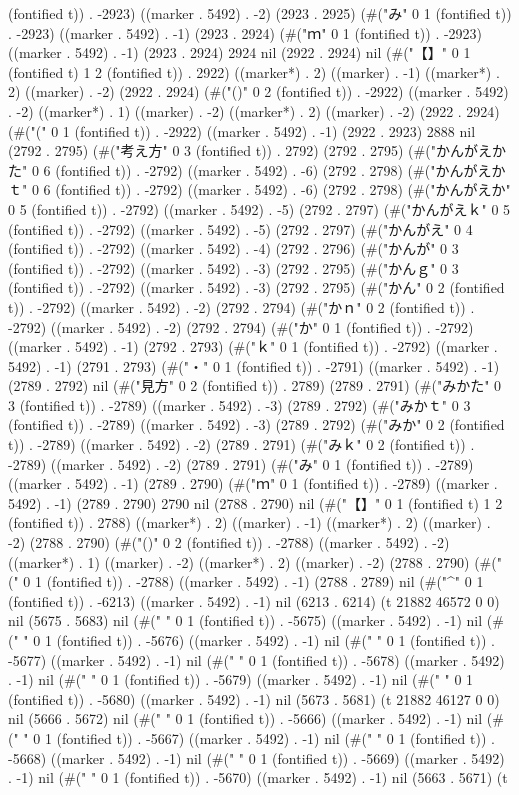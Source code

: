 (fontified t)) . -2923) ((marker . 5492) . -2) (2923 . 2925) (#("み" 0 1 (fontified t)) . -2923) ((marker . 5492) . -1) (2923 . 2924) (#("ｍ" 0 1 (fontified t)) . -2923) ((marker . 5492) . -1) (2923 . 2924) 2924 nil (2922 . 2924) nil (#("【】" 0 1 (fontified t) 1 2 (fontified t)) . 2922) ((marker*) . 2) ((marker) . -1) ((marker*) . 2) ((marker) . -2) (2922 . 2924) (#("()" 0 2 (fontified t)) . -2922) ((marker . 5492) . -2) ((marker*) . 1) ((marker) . -2) ((marker*) . 2) ((marker) . -2) (2922 . 2924) (#("(" 0 1 (fontified t)) . -2922) ((marker . 5492) . -1) (2922 . 2923) 2888 nil (2792 . 2795) (#("考え方" 0 3 (fontified t)) . 2792) (2792 . 2795) (#("かんがえかた" 0 6 (fontified t)) . -2792) ((marker . 5492) . -6) (2792 . 2798) (#("かんがえかｔ" 0 6 (fontified t)) . -2792) ((marker . 5492) . -6) (2792 . 2798) (#("かんがえか" 0 5 (fontified t)) . -2792) ((marker . 5492) . -5) (2792 . 2797) (#("かんがえｋ" 0 5 (fontified t)) . -2792) ((marker . 5492) . -5) (2792 . 2797) (#("かんがえ" 0 4 (fontified t)) . -2792) ((marker . 5492) . -4) (2792 . 2796) (#("かんが" 0 3 (fontified t)) . -2792) ((marker . 5492) . -3) (2792 . 2795) (#("かんｇ" 0 3 (fontified t)) . -2792) ((marker . 5492) . -3) (2792 . 2795) (#("かん" 0 2 (fontified t)) . -2792) ((marker . 5492) . -2) (2792 . 2794) (#("かｎ" 0 2 (fontified t)) . -2792) ((marker . 5492) . -2) (2792 . 2794) (#("か" 0 1 (fontified t)) . -2792) ((marker . 5492) . -1) (2792 . 2793) (#("ｋ" 0 1 (fontified t)) . -2792) ((marker . 5492) . -1) (2791 . 2793) (#("・" 0 1 (fontified t)) . -2791) ((marker . 5492) . -1) (2789 . 2792) nil (#("見方" 0 2 (fontified t)) . 2789) (2789 . 2791) (#("みかた" 0 3 (fontified t)) . -2789) ((marker . 5492) . -3) (2789 . 2792) (#("みかｔ" 0 3 (fontified t)) . -2789) ((marker . 5492) . -3) (2789 . 2792) (#("みか" 0 2 (fontified t)) . -2789) ((marker . 5492) . -2) (2789 . 2791) (#("みｋ" 0 2 (fontified t)) . -2789) ((marker . 5492) . -2) (2789 . 2791) (#("み" 0 1 (fontified t)) . -2789) ((marker . 5492) . -1) (2789 . 2790) (#("ｍ" 0 1 (fontified t)) . -2789) ((marker . 5492) . -1) (2789 . 2790) 2790 nil (2788 . 2790) nil (#("【】" 0 1 (fontified t) 1 2 (fontified t)) . 2788) ((marker*) . 2) ((marker) . -1) ((marker*) . 2) ((marker) . -2) (2788 . 2790) (#("()" 0 2 (fontified t)) . -2788) ((marker . 5492) . -2) ((marker*) . 1) ((marker) . -2) ((marker*) . 2) ((marker) . -2) (2788 . 2790) (#("(" 0 1 (fontified t)) . -2788) ((marker . 5492) . -1) (2788 . 2789) nil (#("^" 0 1 (fontified t)) . -6213) ((marker . 5492) . -1) nil (6213 . 6214) (t 21882 46572 0 0) nil (5675 . 5683) nil (#(" " 0 1 (fontified t)) . -5675) ((marker . 5492) . -1) nil (#(" " 0 1 (fontified t)) . -5676) ((marker . 5492) . -1) nil (#(" " 0 1 (fontified t)) . -5677) ((marker . 5492) . -1) nil (#(" " 0 1 (fontified t)) . -5678) ((marker . 5492) . -1) nil (#(" " 0 1 (fontified t)) . -5679) ((marker . 5492) . -1) nil (#(" " 0 1 (fontified t)) . -5680) ((marker . 5492) . -1) nil (5673 . 5681) (t 21882 46127 0 0) nil (5666 . 5672) nil (#(" " 0 1 (fontified t)) . -5666) ((marker . 5492) . -1) nil (#(" " 0 1 (fontified t)) . -5667) ((marker . 5492) . -1) nil (#(" " 0 1 (fontified t)) . -5668) ((marker . 5492) . -1) nil (#(" " 0 1 (fontified t)) . -5669) ((marker . 5492) . -1) nil (#(" " 0 1 (fontified t)) . -5670) ((marker . 5492) . -1) nil (5663 . 5671) (t 